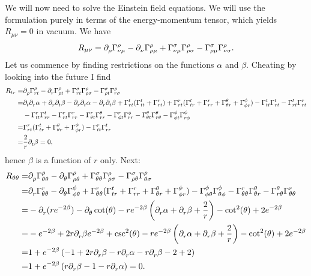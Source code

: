 We will now need to solve the Einstein field equations. We will use the formulation purely in terms of the energy-momentum tensor, which yields $R_{\mu\nu} = 0$ in vacuum. We have
\begin{align*}
	R_{\mu\nu} = \del{\rho}{\chris{\rho}{\nu}{\mu}} - \del{\nu}{\chris{\rho}{\rho}{\mu}} + \chris{\sigma}{\nu}{\mu}\chris{\rho}{\rho}{\sigma} - \chris{\sigma}{\rho}{\mu}\chris{\rho}{\nu}{\sigma}.
\end{align*}
Let us commence by finding restrictions on the functions $\alpha$ and $\beta$. Cheating by looking into the future I find
\begin{align*}
	R_{tr} =& \del{\rho}{\chris{\rho}{r}{t}} - \del{r}{\chris{\rho}{\rho}{t}} + \chris{\sigma}{r}{t}\chris{\rho}{\rho}{\sigma} - \chris{\sigma}{\rho}{t}\chris{\rho}{r}{\sigma} \\
	       =& \del{t}{\del{r}{\alpha}} + \del{r}{\del{t}{\beta}} - \del{r}{\del{t}{\alpha}} - \del{r}{\del{t}{\beta}} + \chris{t}{r}{t}(\chris{t}{t}{t} + \chris{r}{r}{t}) + \chris{r}{r}{t}(\chris{t}{t}{r} + \chris{r}{r}{r} + \chris{\theta}{\theta}{r} + \chris{\phi}{\phi}{r}) - \chris{t}{t}{t}\chris{t}{r}{t} - \chris{t}{r}{t}\chris{r}{r}{t} \\
	        &- \chris{r}{t}{t}\chris{t}{r}{r} - \chris{r}{r}{t}\chris{r}{r}{r} - \chris{r}{\theta}{t}\chris{\theta}{r}{r} - \chris{r}{\phi}{t}\chris{\phi}{r}{r} - \chris{\theta}{\theta}{t}\chris{\theta}{r}{\theta} - \chris{\phi}{\phi}{t}\chris{\phi}{r}{\phi} \\
	       =& \chris{r}{r}{t}(\chris{t}{t}{r} + \chris{\theta}{\theta}{r} + \chris{\phi}{\phi}{r}) - \chris{r}{t}{t}\chris{t}{r}{r} \\
	       =& \frac{2}{r}\del{t}{\beta} = 0,
\end{align*}
hence $\beta$ is a function of $r$ only. Next:
\begin{align*}
	R_{\theta\theta} =& \del{\rho}{\chris{\rho}{\theta}{\theta}} - \del{\theta}{\chris{\rho}{\rho}{\theta}} + \chris{\sigma}{\theta}{\theta}\chris{\rho}{\rho}{\sigma} - \chris{\sigma}{\rho}{\theta}\chris{\rho}{\theta}{\sigma} \\
	                 =& \del{r}{\chris{r}{\theta}{\theta}} - \del{\theta}{\chris{\phi}{\phi}{\theta}} + \chris{r}{\theta}{\theta}(\chris{t}{t}{r} + \chris{r}{r}{r} + \chris{\theta}{\theta}{r} + \chris{\phi}{\phi}{r}) - \chris{\phi}{\phi}{\theta}\chris{\phi}{\theta}{\phi} - \chris{r}{\theta}{\theta}\chris{\theta}{\theta}{r} - \chris{\theta}{r}{\theta}\chris{r}{\theta}{\theta} \\
	                 =& -\del{r}{(re^{-2\beta})} - \del{\theta}{\cot(\theta)} - re^{-2\beta}\left(\del{r}{\alpha} + \del{r}{\beta} + \frac{2}{r}\right) - \cot[2](\theta) + 2e^{-2\beta} \\
	                 =& -e^{-2\beta} + 2r\del{r}{\beta}e^{-2\beta} + \csc[2](\theta) - re^{-2\beta}\left(\del{r}{\alpha} + \del{r}{\beta} + \frac{2}{r}\right) - \cot[2](\theta) + 2e^{-2\beta} \\
	                 =& 1 + e^{-2\beta}\left(-1 + 2r\del{r}{\beta} - r\del{r}{\alpha} - r\del{r}{\beta} - 2 + 2\right) \\
	                 =& 1 + e^{-2\beta}\left(r\del{r}{\beta} - 1 - r\del{r}{\alpha}\right) = 0.
\end{align*}
